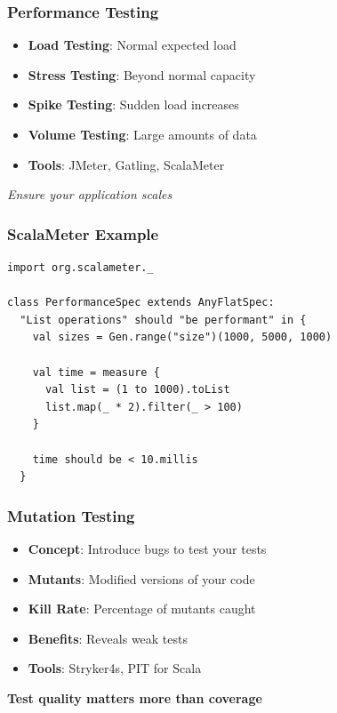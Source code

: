\documentclass{beamer}
\begin{document}
\begin{frame}
\frametitle{Performance Testing}

\begin{itemize}
  \item \textbf{Load Testing}: Normal expected load
  \item \textbf{Stress Testing}: Beyond normal capacity
  \item \textbf{Spike Testing}: Sudden load increases
  \item \textbf{Volume Testing}: Large amounts of data
  \item \textbf{Tools}: JMeter, Gatling, ScalaMeter
\end{itemize}

\vspace{0.3cm}
\textit{Ensure your application scales}

\end{frame}

\begin{frame}[fragile]
\frametitle{ScalaMeter Example}

\begin{lstlisting}[style=scalaStyle]
import org.scalameter._

class PerformanceSpec extends AnyFlatSpec:
  "List operations" should "be performant" in {
    val sizes = Gen.range("size")(1000, 5000, 1000)
    
    val time = measure {
      val list = (1 to 1000).toList
      list.map(_ * 2).filter(_ > 100)
    }
    
    time should be < 10.millis
  }
\end{lstlisting}

\end{frame}

\begin{frame}
\frametitle{Mutation Testing}

\begin{itemize}
  \item \textbf{Concept}: Introduce bugs to test your tests
  \item \textbf{Mutants}: Modified versions of your code
  \item \textbf{Kill Rate}: Percentage of mutants caught
  \item \textbf{Benefits}: Reveals weak tests
  \item \textbf{Tools}: Stryker4s, PIT for Scala
\end{itemize}

\vspace{0.3cm}
\textbf{Test quality matters more than coverage}

\end{frame}
\end{document}
